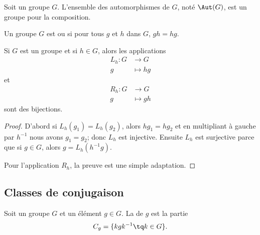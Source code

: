 \begin{lemmaDef}        \label{LEMooSQQDooCmOvqi}
    Soit un groupe \( G\). L'ensemble des automorphismes de \( G\), noté \( \Aut(G)\), est un groupe pour la composition.
\end{lemmaDef}

\begin{definition}
    Un groupe \( G\) est  ou  si pour tous \( g\) et \( h\) dans \( G\), \( gh=hg\).
\end{definition}

\begin{lemma}       \label{LEMooBIBFooBHxFYC}
    Si \( G\) est un groupe et si \( h\in G\), alors les applications
    \begin{equation}
        \begin{aligned}
            L_h\colon G&\to G \\
            g&\mapsto hg 
        \end{aligned}
    \end{equation}
    et
    \begin{equation}
        \begin{aligned}
            R_h\colon G&\to G \\
            g&\mapsto gh 
        \end{aligned}
    \end{equation}
    sont des bijections.
\end{lemma}

\begin{proof}
    D'abord si \( L_h(g_1)=L_h(g_2)\), alors \( hg_1=hg_2\) et en multipliant à gauche par \( h^{-1}\) nous avons \( g_1=g_2\); donc \( L_h\) est injective. Ensuite \( L_h\) est surjective parce que si \( g\in G\), alors \( g=L_h(h^{-1} g)\).

    Pour l'application \( R_h\), la preuve est une simple adaptation.
\end{proof}

\subsection{Classes de conjugaison}

\begin{definition}       \label{DEFooOLXPooWelsZV}
    Soit un groupe \( G\) et un élément \( g\in G\). La  de \( g\) est la partie
    \begin{equation}
        C_g=\{ kgk^{-1}\tq k\in G \}.
    \end{equation}
\end{definition}

